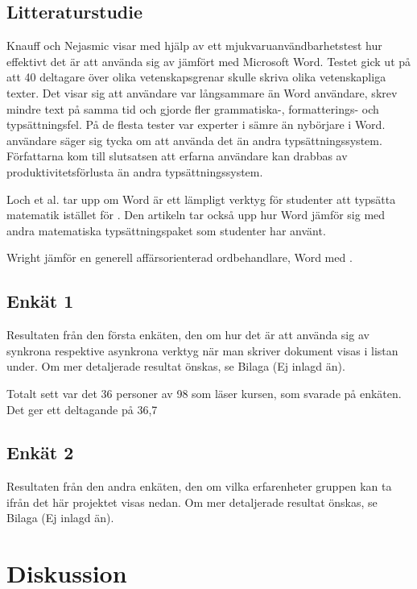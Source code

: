 \subsection{Litteraturstudie}
Knauff och Nejasmic \cite{knauff2014efficiency} visar med hjälp av ett mjukvaruanvändbarhetstest hur effektivt det är att använda sig av \latex jämfört med Microsoft Word. Testet gick ut på att 40 deltagare över olika vetenskapsgrenar skulle skriva olika vetenskapliga texter.
Det visar sig att \latex användare var långsammare än Word användare, skrev mindre text på samma tid och gjorde fler grammatiska-, formatterings- och typsättningsfel. På de flesta tester var experter i \latex sämre än nybörjare i Word. \latex användare säger sig tycka om att använda det än andra typsättningssystem. Författarna kom till slutsatsen att erfarna \latex användare kan drabbas av produktivitetsförlusta än andra typsättningssystem.

Loch et al. \cite{loch2014master} tar upp om Word är ett lämpligt verktyg för studenter att typsätta matematik istället för \latex. Den artikeln tar också upp hur Word jämför sig med andra matematiska typsättningspaket som studenter har använt. 

Wright \cite{wright2010technical} jämför en generell affärsorienterad ordbehandlare, Word med \latex.  


\subsection{Enkät 1}
Resultaten från den första enkäten, den om hur det är att använda sig av synkrona respektive asynkrona verktyg när man skriver dokument visas i listan under. Om mer detaljerade resultat önskas, se Bilaga (Ej inlagd än).

Totalt sett var det 36 personer av 98 som läser kursen, som svarade på enkäten. Det ger ett deltagande på 36,7%

\subsection{Enkät 2}
Resultaten från den andra enkäten, den om vilka erfarenheter gruppen kan ta ifrån det här projektet visas nedan. Om mer detaljerade resultat önskas, se Bilaga (Ej inlagd än).

\section{Diskussion}
\label{sec:discussion-tuhkala}

